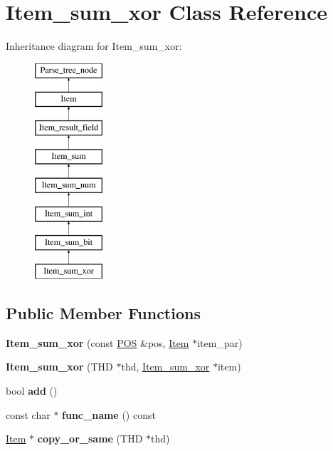 \hypertarget{classItem__sum__xor}{}\section{Item\+\_\+sum\+\_\+xor Class Reference}
\label{classItem__sum__xor}
Inheritance diagram for Item\+\_\+sum\+\_\+xor\+:\begin{figure}[H]
\begin{center}
\leavevmode
\includegraphics[height=8.000000cm]{classItem__sum__xor}
\end{center}
\end{figure}
\subsection*{Public Member Functions}
\begin{DoxyCompactItemize}
\item 
\mbox{\label{classItem__sum__xor_a01dff1b8c387fe20e39bcf80d4d74447}} 
{\bfseries Item\+\_\+sum\+\_\+xor} (const \mbox{\hyperlink{structYYLTYPE}{P\+OS}} \&pos, \mbox{\hyperlink{classItem}{Item}} $\ast$item\+\_\+par)
\item 
\mbox{\label{classItem__sum__xor_a65032780b1d27eb3119b7e0f79337131}} 
{\bfseries Item\+\_\+sum\+\_\+xor} (T\+HD $\ast$thd, \mbox{\hyperlink{classItem__sum__xor}{Item\+\_\+sum\+\_\+xor}} $\ast$item)
\item 
\mbox{\label{classItem__sum__xor_aafaba9aa8ed9acebbaa067e7a4821791}} 
bool {\bfseries add} ()
\item 
\mbox{\label{classItem__sum__xor_a87764915f75424fcb926ce8826b42689}} 
const char $\ast$ {\bfseries func\+\_\+name} () const
\item 
\mbox{\label{classItem__sum__xor_a788b7cff74fea23ca1feb915ee72509e}} 
\mbox{\hyperlink{classItem}{Item}} $\ast$ {\bfseries copy\+\_\+or\+\_\+same} (T\+HD $\ast$thd)
\end{DoxyCompactItemize}
